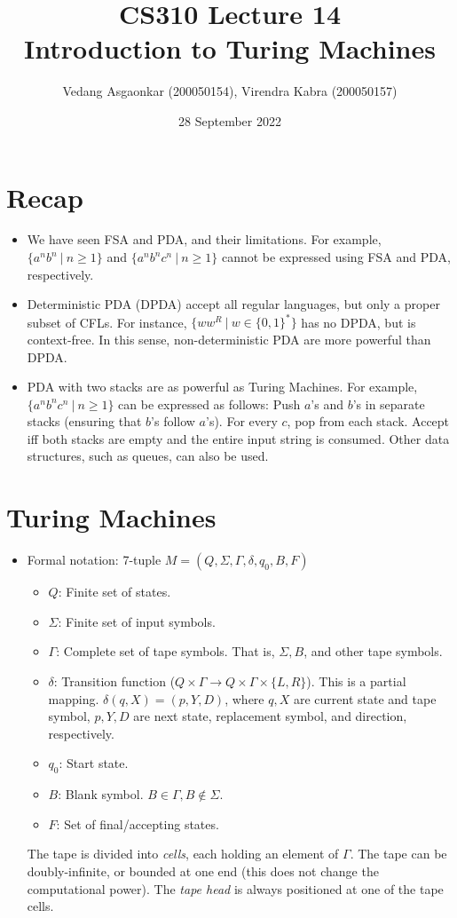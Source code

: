 \documentclass{article}
\title{\textbf{CS310 Lecture 14 \\ Introduction to Turing Machines}}
\author{Vedang Asgaonkar (200050154), Virendra Kabra (200050157)}
\date{28 September 2022}
\newcommand{\I}[1]{\textit{#1}}
\begin{document}
\begin{sloppypar}       %

    \maketitle

    \section{Recap}
    \begin{itemize}
        \item We have seen FSA and PDA, and their limitations. For example, $\{a^nb^n\ |\ n\ge1\}$ and $\{a^nb^nc^n\ |\ n\ge1\}$ cannot be expressed using FSA and PDA, respectively.
        \item Deterministic PDA (DPDA) accept all regular languages, but only a proper subset of CFLs. For instance, $\{ww^R\ |\ w\in\{0,1\}^*\}$ has no DPDA, but is context-free. In this sense, non-deterministic PDA are more powerful than DPDA.
        \item PDA with two stacks are as powerful as Turing Machines. For example, $\{a^nb^nc^n\ |\ n\ge1\}$ can be expressed as follows: Push $a$'s and $b$'s in separate stacks (ensuring that $b$'s follow $a$'s). For every $c$, pop from each stack. Accept iff both stacks are empty and the entire input string is consumed. Other data structures, such as queues, can also be used.
    \end{itemize}

    \section{Turing Machines}
    \begin{itemize}
        \item Formal notation: 7-tuple $M = (Q,\Sigma,\Gamma,\delta,q_0,B,F)$
        \begin{itemize}
            \item $Q$: Finite set of states.
            \item $\Sigma$: Finite set of input symbols.
            \item $\Gamma$: Complete set of tape symbols. That is, $\Sigma, B$, and other tape symbols.
            \item $\delta$: Transition function ($Q\times\Gamma \rightarrow Q\times\Gamma\times\{L,R\}$). This is a partial mapping. $\delta(q,X) = (p,Y,D)$, where $q,X$ are current state and tape symbol, $p,Y,D$ are next state, replacement symbol, and direction, respectively.
            \item $q_0$: Start state.
            \item $B$: Blank symbol. $B\in\Gamma, B\notin\Sigma$.
            \item $F$: Set of final/accepting states.
        \end{itemize}
        The tape is divided into \I{cells}, each holding an element of $\Gamma$. The tape can be doubly-infinite, or bounded at one end (this does not change the computational power). The \I{tape head} is always positioned at one of the tape cells.


\end{itemize}
\end{sloppypar}
\end{document}
